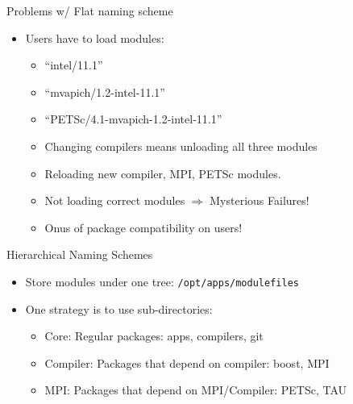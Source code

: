 \documentclass{beamer}
\begin{document}
\begin{frame}{Problems w/ Flat naming scheme}
  \begin{itemize}
    \item Users have to load modules:
      \begin{itemize}
        \item ``intel/11.1''
        \item ``mvapich/1.2-intel-11.1''
        \item ``PETSc/4.1-mvapich-1.2-intel-11.1''
        \item Changing compilers means unloading all three modules
        \item Reloading new compiler, MPI, PETSc modules.
        \item Not loading correct modules $\Rightarrow$ Mysterious Failures!
        \item Onus of package compatibility on users! 
      \end{itemize}
  \end{itemize}
\end{frame}


\begin{frame}{Hierarchical Naming Schemes}
  \begin{itemize}
    \item Store modules under one tree: \texttt{/opt/apps/modulefiles}
    \item One strategy is to use sub-directories:
      \begin{itemize}
        \item Core: Regular packages: apps, compilers, git
        \item Compiler: Packages that depend on compiler: boost, MPI
        \item MPI: Packages that depend on MPI/Compiler: PETSc, TAU
      \end{itemize}

  \end{itemize}
\end{frame}
\end{document}
